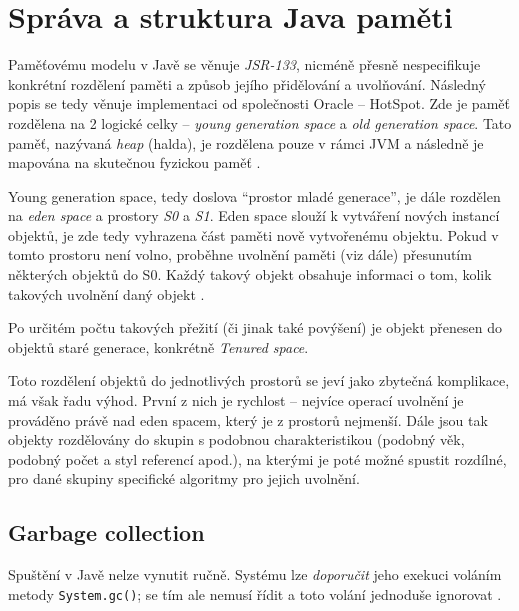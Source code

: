 


\chapter{Správa a struktura Java paměti}

Paměťovému modelu v Javě se věnuje \textit{JSR-133}, nicméně přesně nespecifikuje konkrétní rozdělení paměti a způsob jejího přidělování a uvolňování. Následný popis se tedy věnuje implementaci od společnosti Oracle – HotSpot. Zde je paměť rozdělena na 2 logické celky – \textit{young generation space} a \textit{old generation space}. Tato paměť, nazývaná \textit{heap} (halda), je rozdělena pouze v rámci JVM a následně je mapována na skutečnou fyzickou paměť \cite{jsr133}.

Young generation space, tedy doslova “prostor mladé generace”, je dále rozdělen na \textit{eden space} a prostory \textit{S0} a \textit{S1}. Eden space slouží k vytváření nových instancí objektů, je zde tedy vyhrazena část paměti nově vytvořenému objektu. Pokud v tomto prostoru není volno, proběhne uvolnění paměti (viz dále) přesunutím některých objektů do S0. Každý takový objekt obsahuje informaci o tom, kolik takových uvolnění daný objekt .

Po určitém počtu takových přežití (či jinak také povýšení) je objekt přenesen do objektů staré generace, konkrétně \textit{Tenured space}.

Toto rozdělení objektů do jednotlivých prostorů se jeví jako zbytečná komplikace, má však řadu výhod. První z nich je rychlost – nejvíce operací uvolnění je prováděno právě nad eden spacem, který je z prostorů nejmenší. Dále jsou tak objekty rozdělovány do skupin s podobnou charakteristikou (podobný věk, podobný počet a styl referencí apod.), na kterými je poté možné spustit rozdílné, pro dané skupiny specifické algoritmy pro jejich uvolnění.

\section{Garbage collection}
	Spuštění  v Javě nelze vynutit ručně. Systému lze \textit{doporučit} jeho exekuci voláním metody \texttt{System.gc()};  se tím ale nemusí řídit a toto volání jednoduše ignorovat \cite{javagc}. 

